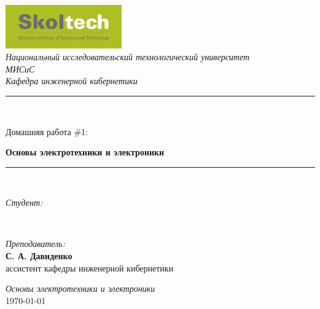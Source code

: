 \begin{titlepage}
    \newcommand{\HRule}{\rule{\linewidth}{0.5mm}}
    \includegraphics[width=5cm]{title/logo.png}\\[0.3cm] 
    \center 
    \textsl{\Large Национальный исследовательский технологический университет}\\[0.3cm] 
    \textsl{\Large МИСиС}\\[0.5cm] 
    \textsl{\large Кафедра инженерной кибернетики}\\[0.5cm] 
    \makeatletter
    
    \HRule \\[0.4cm]
    \raggedright{{ \huge Домашняя работа \#1:}\par}
    \center 
    { \huge }
    { \huge \bfseries Основы электротехники и электроники }\\[0.4cm] 
    \HRule \\[1.5cm]
    \begin{minipage}{0.4\textwidth}
    \begin{flushleft} \large
    \emph{Студент:}\\
    \@author 
    \end{flushleft}
    \end{minipage}
    ~
    \begin{minipage}{0.5\textwidth}
    \begin{flushright} \large
    \emph{Преподаватель:} \\
    \textup{\textbf{С. А. Давиденко} \\
    ассистент кафедры инженерной кибернетики }
    \end{flushright}
    \end{minipage}
    \makeatother
    
    \vfill
    
    {\large \emph{Основы электротехники и электроники}}\\[0.5cm]
    \vspace{2cm}
    {\large \today}
    
    
    
    \end{titlepage}